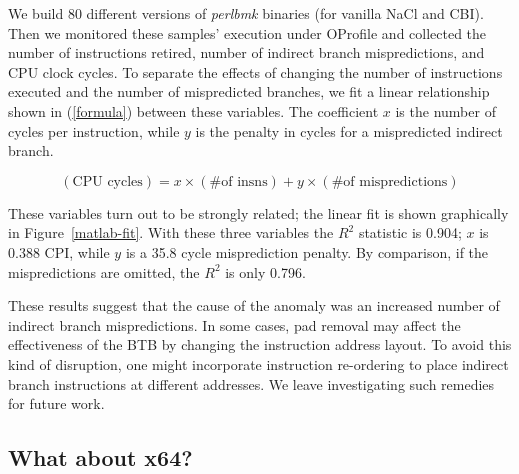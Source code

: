 \documentclass[conference]{IEEEtran}
\begin{document}
We build 80 different versions of \textit{perlbmk} binaries (for vanilla NaCl and CBI). Then we monitored these samples' execution under OProfile and collected the number of instructions retired, number of indirect branch mispredictions, and CPU clock cycles.
To separate the effects of changing the number of instructions
executed and the number of mispredicted branches, we fit a linear
relationship shown in (\ref{formula}) between these variables.
The coefficient $x$ is the number of cycles per instruction, while $y$
is the penalty in cycles for a mispredicted indirect branch.
\begin{small}
\begin{equation}
\label{formula}
(\text{CPU cycles}) = x\times(\text{\# of insns}) + y\times(\text{\# of mispredictions})
\end{equation}
\end{small}
These variables turn out to be strongly related; the linear fit is
shown graphically in Figure~\ref{matlab-fit}.
With these three variables the $R^2$ statistic is 0.904; $x$ is 0.388
CPI, while $y$ is a 35.8 cycle misprediction penalty.
By comparison, if the mispredictions are omitted, the $R^2$ is only
0.796.

These results suggest that the cause of the anomaly was an increased number of indirect branch mispredictions. In some cases, pad removal may affect the effectiveness of the BTB by changing the instruction address layout. To avoid this kind of disruption, one might incorporate instruction re-ordering to place indirect branch instructions at different addresses. We leave investigating such remedies for future work.



\begin{figure*}[!t]
\centering
{}
\hfil
{}
\caption{Correlation between CPU Clock Cycles and Indirect Branch Misprediction for  \textit{perlbmk}}
\label{matlab-fit}
\end{figure*}


\subsection{What about x64?}
\end{document}
